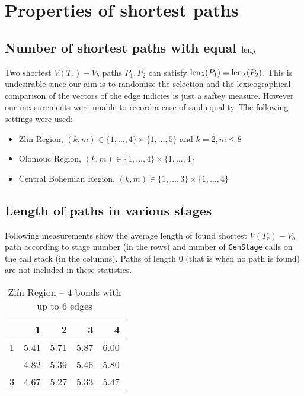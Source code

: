 \clearpage

\section{Properties of shortest paths}

\subsection*{Number of shortest paths with equal $\operatorname{len}_\lambda$}

Two shortest $V(T_r){-}V_b$ paths $P_1, P_2$ can satisfy $\operatorname{len}_\lambda(P_1) = \operatorname{len}_\lambda(P_2)$. This is undesirable since our aim is to randomize the selection and the lexicographical comparison of the vectors of the edge indicies is just a saftey measure. However our measurements were unable to record a case of said equality. The following settings were used:

\begin{itemize}
	\item Zlín Region, $(k, m) \in \{1,\ldots,4\} \times \{1,\ldots,5\}$ and $k=2, m \leq 8$
	\item Olomouc Region, $(k, m) \in \{1,\ldots,4\} \times \{1,\ldots,4\}$
	\item Central Bohemian Region, $(k, m) \in \{1,\ldots,3\} \times \{1,\ldots,4\}$
\end{itemize}

\subsection*{Length of paths in various stages}

Following measurements show the average length of found shortest $V(T_r){-}V_b$ path according to stage number (in the rows) and number of \lstinline|GenStage| calls on the call stack (in the columns). Paths of length $0$ (that is when no path is found) are not included in these statistics.

\begin{table}[H]
	\caption{Zlín Region -- $4$-bonds with up to 6 edges}
	\centering
	\begin{tabular}{c|rrrr}
		\toprule
		        & 1    & 2    & 3  	 & 4	  \\ \hline
		1       & 5.41 & 5.71 & 5.87 & 6.00  \\
		\evenrowcolor
		2       & 4.82 & 5.39 & 5.46 & 5.80 \\
		3       & 4.67 & 5.27 & 5.33 & 5.47
	\end{tabular}
\end{table}

